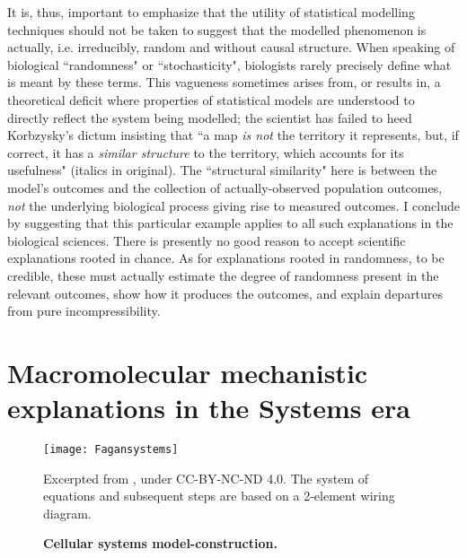 It is, thus, important to emphasize that the utility of statistical modelling techniques should not be taken to suggest that the modelled phenomenon is actually, i.e. irreducibly, random and without causal structure. When speaking of biological ``randomness" or ``stochasticity", biologists rarely precisely define what is meant by these terms. This vagueness sometimes arises from, or results in, a theoretical deficit where properties of statistical models are understood to directly reflect the system being modelled; the scientist has failed to heed Korbzysky's dictum insisting that ``a map \textit{is not} the territory it represents, but, if correct, it has a \textit{similar structure} to the territory, which accounts for its usefulness" \cite{Korzybski2005} (italics in original). The ``structural similarity" here is between the model's outcomes and the collection of actually-observed population outcomes, \textit{not} the underlying biological process giving rise to measured outcomes. I conclude by suggesting that this particular example applies to all such explanations in the biological sciences. There is presently no good reason to accept scientific explanations rooted in chance. As for explanations rooted in randomness, to be credible, these must actually estimate the degree of randomness present in the relevant outcomes, show how it produces the outcomes, and explain departures from pure incompressibility.

\section{Macromolecular mechanistic explanations in the Systems era}

\begin{wrapfigure}{l}{0.4\textwidth}
    \texttt{[image: Fagansystems]}
    \caption{\bf{Cellular systems model-construction.}} Excerpted from \cite[p.7]{Fagan2015}, under CC-BY-NC-ND 4.0. The system of equations and subsequent steps are based on a 2-element wiring diagram.
    \label{fig:faganSystems}
\end{wrapfigure}

